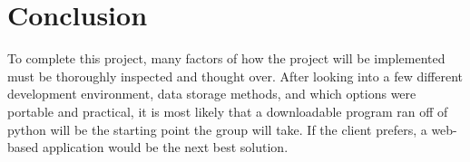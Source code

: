 \documentclass[onecolumn, draftclsnofoot,10pt, compsoc]{IEEEtran}
\begin{document}
\section{Conclusion}
To complete this project, many factors of how the project will be implemented must be thoroughly inspected and thought over. After looking into a few different development environment, data storage methods, and which options were portable and practical, it is most likely that a downloadable program ran off of python will be the starting point the group will take. If the client prefers, a web-based application would be the next best solution. 

\newpage

\nocite{*}%


\end{document}

